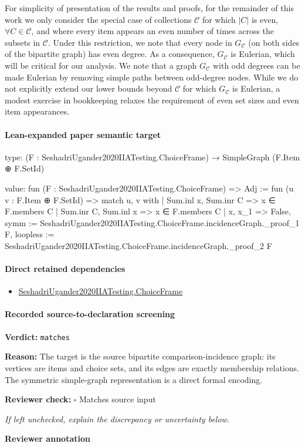 \documentclass[10pt]{article}
\newcommand{\reviewerbox}{%
  \par\noindent\fbox{\parbox{0.96\linewidth}{\rule{0pt}{0.38in}}}\par
}
\newcommand{\reviewmatch}[1]{%
  \par\noindent\textbf{Reviewer check:} $\square$\; #1\par
  \noindent\emph{If left unchecked, explain the discrepancy or uncertainty below.}\par
}
\begin{document}
\begin{ReviewVerbatim}
	For simplicity of presentation of the results and proofs, for the remainder of this work we only consider the special case of collections $\mathcal{C}$ for which $|C|$ is even, $\forall C \in \mathcal{C}$, and where every item appears an even number of times across the subsets in $\mathcal{C}$. Under this restriction, we note that every node in $G_\mathcal{C}$ (on both sides of the bipartite graph) has even degree. As a consequence, $G_\mathcal{C}$ is Eulerian, which will be critical for our analysis.
	We note that a graph $G_\mathcal{C}$ with odd degrees can be made Eulerian by removing simple paths between odd-degree nodes. While we do not explicitly extend our lower bounds beyond $\mathcal C$ for which $G_\mathcal{C}$ is Eulerian, a modest exercise in bookkeeping relaxes the requirement of even set sizes and even item appearances.
\end{ReviewVerbatim}



\paragraph{Lean-expanded paper semantic target}
\begin{ReviewVerbatim}
type:
(F : SeshadriUgander2020IIATesting.ChoiceFrame) → SimpleGraph (F.Item ⊕ F.SetId)

value:
fun (F : SeshadriUgander2020IIATesting.ChoiceFrame) =>
  {
    Adj := fun (u v : F.Item ⊕ F.SetId) =>
      match u, v with
      | Sum.inl x, Sum.inr C => x ∈ F.members C
      | Sum.inr C, Sum.inl x => x ∈ F.members C
      | x, x_1 => False,
    symm := SeshadriUgander2020IIATesting.ChoiceFrame.incidenceGraph._proof_1 F,
    loopless := SeshadriUgander2020IIATesting.ChoiceFrame.incidenceGraph._proof_2 F }
\end{ReviewVerbatim}

\paragraph{Direct retained dependencies}
\begin{itemize}\raggedright
\item \hyperlink{paper-prerequisite-0b24d39c6f4d1898}{Seshadri\allowbreak{}Ugander2020\allowbreak{}IIA\allowbreak{}Testing.\allowbreak{}Choice\allowbreak{}Frame}
\end{itemize}
\paragraph{Recorded source-to-declaration screening}
\textbf{Verdict:} \texttt{matches}
\\
{\raggedright
\textbf{Reason:} The target is the source bipartite comparison-\allowbreak{}incidence graph:\allowbreak{} its vertices are items and choice sets, and its edges are exactly membership relations.\allowbreak{} The symmetric simple-\allowbreak{}graph representation is a direct formal encoding.\allowbreak{}
\par}
\reviewmatch{Matches source input}
\noindent\textbf{Reviewer annotation}\par
\reviewerbox
\clearpage
\hypertarget{paper-prerequisite-5dca52f4dfdd597a}{}
\end{document}
